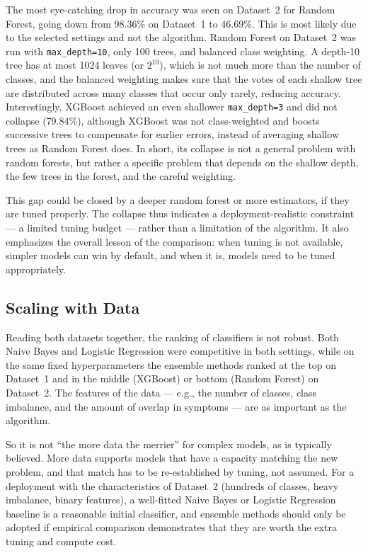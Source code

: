 The most eye-catching drop in accuracy was seen on Dataset~2 for Random Forest, going down from 98.36\% on Dataset~1 to 46.69\%. This is most likely due to the selected settings and not the algorithm. Random Forest on Dataset~2 was run with \texttt{max\_depth=10}, only 100 trees, and balanced class weighting. A depth-10 tree has at most 1024 leaves (or $2^{10}$), which is not much more than the number of classes, and the balanced weighting makes sure that the votes of each shallow tree are distributed across many classes that occur only rarely, reducing accuracy. Interestingly, XGBoost achieved an even shallower \texttt{max\_depth=3} and did not collapse (79.84\%), although XGBoost was not class-weighted and boosts successive trees to compensate for earlier errors, instead of averaging shallow trees as Random Forest does. In short, its collapse is not a general problem with random forests, but rather a specific problem that depends on the shallow depth, the few trees in the forest, and the careful weighting.

This gap could be closed by a deeper random forest or more estimators, if they are tuned properly. The collapse thus indicates a deployment-realistic constraint --- a limited tuning budget --- rather than a limitation of the algorithm. It also emphasizes the overall lesson of the comparison: when tuning is not available, simpler models can win by default, and when it is, models need to be tuned appropriately.

\subsection{Scaling with Data}

Reading both datasets together, the ranking of classifiers is not robust. Both Naive Bayes and Logistic Regression were competitive in both settings, while on the same fixed hyperparameters the ensemble methods ranked at the top on Dataset~1 and in the middle (XGBoost) or bottom (Random Forest) on Dataset~2. The features of the data --- e.g., the number of classes, class imbalance, and the amount of overlap in symptoms --- are as important as the algorithm.

So it is not ``the more data the merrier'' for complex models, as is typically believed. More data supports models that have a capacity matching the new problem, and that match has to be re-established by tuning, not assumed. For a deployment with the characteristics of Dataset~2 (hundreds of classes, heavy imbalance, binary features), a well-fitted Naive Bayes or Logistic Regression baseline is a reasonable initial classifier, and ensemble methods should only be adopted if empirical comparison demonstrates that they are worth the extra tuning and compute cost.

